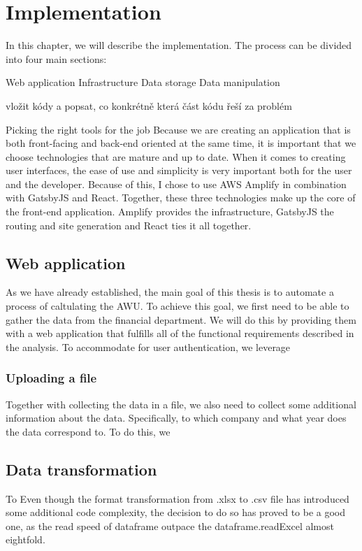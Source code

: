 \documentclass[12pt,oneside]{fithesis2}
\begin{document}
    \chapter{Implementation}
    In this chapter, we will describe the implementation. The process can be divided into four main sections:
    
    Web application
    Infrastructure
    Data storage
    Data manipulation
    
    vložit kódy a popsat, co konkrétně která část kódu řeší za problém

    Picking the right tools for the job
    Because we are creating an application that is both front-facing and back-end oriented at the same time, it is important that we choose technologies that are mature and up to date.
    When it comes to creating user interfaces, the ease of use and simplicity is very important both for the user and the developer. Because of this, I chose to use AWS Amplify in combination with GatsbyJS and React. Together, these three technologies make up the core of the front-end application. Amplify provides the infrastructure, GatsbyJS the routing and site generation and React ties it all together.
    
    \section{Web application}
    As we have already established, the main goal of this thesis is to automate a process of caltulating the AWU. To achieve this goal, we first need to be able to gather the data from the financial department. We will do this by providing them with a web application that fulfills all of the functional requirements described in the analysis.
    To accommodate for user authentication, we leverage 
    
    \subsection{}
    \subsection{Uploading a file}
    Together with collecting the data in a file, we also need to collect some additional information about the data. Specifically, to which company and what year does the data correspond to. To do this, we

    \section{Data transformation}
    To 
    Even though the format transformation from .xlsx to .csv file has introduced some additional code complexity, the decision to do so has proved to be a good one, as the read speed of dataframe outpace the dataframe.readExcel almost eightfold. \cite{csv-read-speed}
\end{document}

